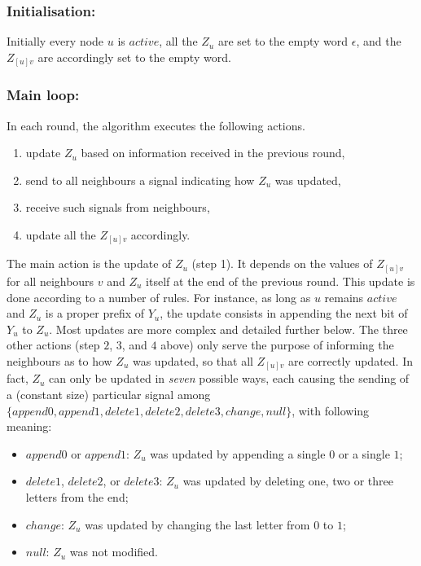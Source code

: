 \documentclass[11pt,envcountsame,letterpaper]{llncs}
\begin{document}
\subsubsection{Initialisation:} Initially every node $u$ is $active$, all the $Z_u$ are set to the empty word $\epsilon$, and the $Z_{[u]v}$ are accordingly set to the empty word.

\subsubsection{Main loop:}  In each round, the algorithm executes the following actions.
\begin{enumerate}[leftmargin=3em]
\item update $Z_u$ based on information received in the previous round,
\item send to all neighbours a signal indicating how $Z_u$ was updated,
\item receive such signals from neighbours,
\item update all the $Z_{[u]v}$ accordingly.
\end{enumerate}

\noindent
The main action is the update of $Z_u$ (step 1).
It depends on the values of $Z_{[u]v}$  for all neighbours $v$ and 
 $Z_u$ itself at the end of the previous round. 
This update is done according to a number of rules. For instance, as long as $u$ remains $active$ and $Z_u$ is a proper prefix of $Y_u$, the update consists in appending the next bit of $Y_u$ to $Z_u$. Most updates are more complex and detailed further below. The three other actions (step $2$, $3$, and $4$ above) only serve the purpose of informing the neighbours as to how $Z_u$ was updated, so that all $Z_{[u]v}$  are correctly updated. In fact, $Z_u$ can only be updated in {\em seven} possible ways, each causing the sending of a (constant size) particular signal among $\{append0, append1, delete1, delete2, delete3, change, null\}$, with following meaning:
\begin{itemize}
\item $append0$ or $append1$: $Z_u$ was updated by appending a single $0$ or a single $1$;
\item $delete1$, $delete2$, or $delete3$: $Z_u$ was updated by deleting one, two or three letters from the end;
\item $change$: $Z_u$ was updated by changing the last letter from $0$ to $1$;
\item $null$: $Z_u$ was not modified.
\end{itemize}
\end{document}
